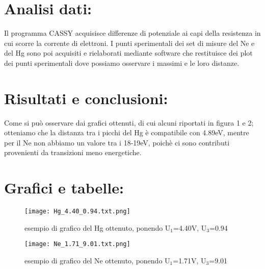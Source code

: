 \documentclass{article}
\begin{document}
\section{Analisi dati:}
Il programma CASSY acquisisce differenze di potenziale ai capi della resistenza in cui scorre la corrente di elettroni. I punti sperimentali dei set di misure del Ne e del Hg sono poi acquisiti e rielaborati mediante software che restituisce dei plot dei punti sperimentali dove possiamo osservare i massimi e le loro distanze.
~
\section{Risultati e conclusioni:}
Come si può osservare dai grafici ottenuti, di cui alcuni riportati in figura 1 e 2; otteniamo che la distanza tra i picchi del Hg è compatibile con 4.89eV, mentre per il Ne non abbiamo un valore tra i 18-19eV, poichè ci sono contributi provenienti da transizioni meno energetiche.
~
\section{Grafici e tabelle:}
\begin{figure}[h!]
    \centering
    \texttt{[image: Hg\_4.40\_0.94.txt.png]}
    \caption{esempio di grafico del Hg ottenuto, ponendo U$_{1}$=4.40V, U$_{3}$=0.94}
    \label{figura1}
\end{figure}
\begin{figure}[h!]
    \centering
    \texttt{[image: Ne\_1.71\_9.01.txt.png]}
    \caption{esempio di grafico del Ne ottenuto, ponendo U$_{1}$=1.71V, U$_{3}$=9.01}
    \label{figura1}
\end{figure}
\end{document}
